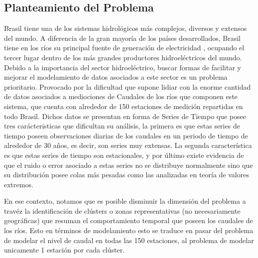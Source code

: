 \documentclass[10pt,a4paper]{article}
\begin{document}
\subsection{Planteamiento del Problema}
Brasil tiene una de los sistemas hidrológicos más complejos, diversos y extensos del mundo. A diferencia de la gran mayoría de los países desarrollados, Brasil tiene en los ríos su principal fuente de generación de electricidad , ocupando el tercer lugar dentro de los más grandes productores hidroeléctricos del mundo. Debido a la importancia del sector hidroeléctrico, buscar formas de facilitar y mejorar el modelamiento de datos asociados a este sector es un problema prioritario. Provocado por la dificultad que supone lidiar con la enorme cantidad de datos asociados a mediociones de Caudales de los ríos que componen este sistema, que cuenta con alrededor de 150 estaciones de medición repartidas en todo Brasil. Dichos datos se presentan en forma de Series de Tiempo que posee tres carácteristicas que dificultan su análisis, la primera es que estas series de tiempo poseen observaciones diarias de los caudales en un periodo de tiempo de alrededor de 30 años, es decir, son series muy extensas. La segunda característica es que estas series de tiempo son estacionales, y por último existe evidencia de que el ruido o error asociado a estas series no se distribuye normalmente sino que su distribución posee colas más pesadas como las analizadas en teoría de valores extremos.

En ese contexto, notamos que es posible disminuir la dimensión del problema a travéz la identificación de clústers o zonas representativas (no necesariamente geográficas) que resuman el comportamiento temporal que poseen los caudales de los ríos. Esto en términos de modelamiento esto se traduce en pasar del problema de modelar el nivel de caudal en todas las 150 estaciones, al problema de modelar unicamente 1 estación por cada clúster. 



\end{document}
